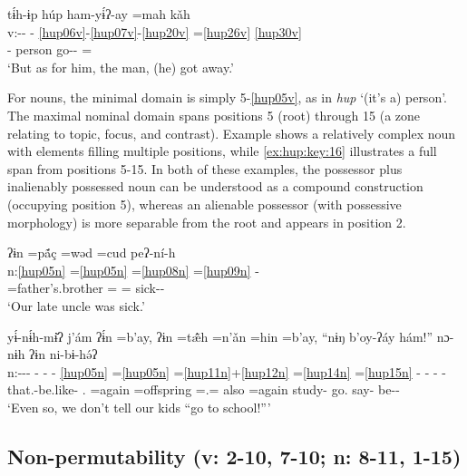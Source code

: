 \documentclass[output=paper]{langscibook}
\begin{document}
\ea\label{ex:hup:key:14} 
\glll tɨ́h-ɨp húp ham-yɨ́ʔ-ay =mah kǎh\\ 
    v:-{}- - \ref{hup06v}-\ref{hup07v}-\ref{hup20v} =\ref{hup26v} \ref{hup30v}\\ 
    \Third\Sg{}-\Dep{} person go-\Tel-\Inch{} =\Rep{} \Advr{}\\ 
\glt `But as for him, the man, (he) got away.'
\z 

For nouns, the minimal domain is simply 5-\ref{hup05v}, as in \textit{hup} `(it's a) person'. The maximal nominal domain spans positions 5 (root) through 15 (a zone relating to topic, focus, and contrast). Example  shows a relatively complex noun with elements filling multiple positions, while \ref{ex:hup:key:16} illustrates a full span from positions 5-15. In both of these examples, the possessor plus inalienably possessed noun can be understood as a compound construction (occupying position 5), whereas an alienable possessor (with possessive morphology) is more separable from the root and appears in position 2.

\ea\label{ex:hup:key:15} 
\glll ʔɨn =p\'{ã}ç =wǝd =cud  peʔ-ní-h \\ 
    n:\ref{hup05n} =\ref{hup05n} =\ref{hup08n} =\ref{hup09n} -\\ 
    \First\Pl{} =father's.brother =\Resp{} =\Dcsd{} sick-\Infr{}-\Decl{}\\ 
\glt `Our late uncle was sick.'
\z 

\ea\label{ex:hup:key:16}
\glll yɨ́-nɨ́h-mɨ̌ʔ j'ám ʔɨ́n =b'ay, ʔɨn =tǽ̃h =n'ǎn\protect\footnotemark{} =hin =b'ay, ``nɨŋ b'oy-ʔáy hám!'' nɔ-nɨh ʔɨn ni-bɨ-hǝ́ʔ\\ 
n:-{}-{}- - - - \ref{hup05n} =\ref{hup05n} =\ref{hup11n}+\ref{hup12n} =\ref{hup14n} =\ref{hup15n} - - - - \\ 
that.\Itg{}-be.like-\Sim{} \Dst.\Cntr{} \First\Pl{} =again \First\Pl{} =offspring =\Pl.\Obj{}= also =again \Second\Pl{} study-\Ven{} go.\Imp{} say-\Neg{} \First\Pl{} be-\Hab{}-\Tag{}\\ 
\glt `Even so, we don't tell our kids ``go to school!'''
\z 



\subsection{Non-permutability (v: 2-10, 7-10; n: 8-11, 1-15)} 
\label{sec:hup:key:4.2}
\end{document}
